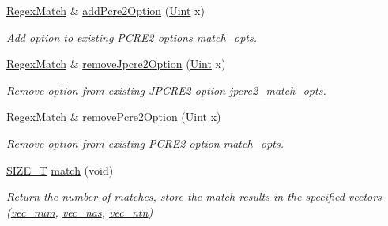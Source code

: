 \begin{DoxyCompactItemize}
\hyperlink{classjpcre2_1_1RegexMatch}{Regex\+Match} \& \hyperlink{classjpcre2_1_1RegexMatch_aac4857cd8f5eae15b29b9afbe9023522}{add\+Pcre2\+Option} (\hyperlink{namespacejpcre2_a078242d38221a13fb3543b9edd78c099}{Uint} x)
\begin{DoxyCompactList}\small\item\em Add option to existing P\+C\+R\+E2 options \hyperlink{classjpcre2_1_1RegexMatch_a697d5731007350b0f20d2018fcfafa90}{match\+\_\+opts}. \end{DoxyCompactList}\item 
\hyperlink{classjpcre2_1_1RegexMatch}{Regex\+Match} \& \hyperlink{classjpcre2_1_1RegexMatch_a580a64c66ea34153559142928d33d78a}{remove\+Jpcre2\+Option} (\hyperlink{namespacejpcre2_a078242d38221a13fb3543b9edd78c099}{Uint} x)
\begin{DoxyCompactList}\small\item\em Remove option from existing J\+P\+C\+R\+E2 option \hyperlink{classjpcre2_1_1RegexMatch_a70d62df887eeed237724f64fbc378700}{jpcre2\+\_\+match\+\_\+opts}. \end{DoxyCompactList}\item 
\hyperlink{classjpcre2_1_1RegexMatch}{Regex\+Match} \& \hyperlink{classjpcre2_1_1RegexMatch_a1405a2d332d1a928ceb67857097be665}{remove\+Pcre2\+Option} (\hyperlink{namespacejpcre2_a078242d38221a13fb3543b9edd78c099}{Uint} x)
\begin{DoxyCompactList}\small\item\em Remove option from existing P\+C\+R\+E2 option \hyperlink{classjpcre2_1_1RegexMatch_a697d5731007350b0f20d2018fcfafa90}{match\+\_\+opts}. \end{DoxyCompactList}\item 
\hyperlink{namespacejpcre2_a2aac465ddcb123560c7c8215dd69246c}{S\+I\+Z\+E\+\_\+T} \hyperlink{classjpcre2_1_1RegexMatch_a5868aef3a146594ea1ebef34d122bb33}{match} (void)
\begin{DoxyCompactList}\small\item\em Return the number of matches, store the match results in the specified vectors (\hyperlink{classjpcre2_1_1RegexMatch_a836705e0444568c78abaab4c8e351335}{vec\+\_\+num}, \hyperlink{classjpcre2_1_1RegexMatch_a812b57dc08fdc0caa93a1b508ef8242c}{vec\+\_\+nas}, \hyperlink{classjpcre2_1_1RegexMatch_a86ef413ab6d237972af858be26ff77f7}{vec\+\_\+ntn}) \end{DoxyCompactList}\end{DoxyCompactItemize}
